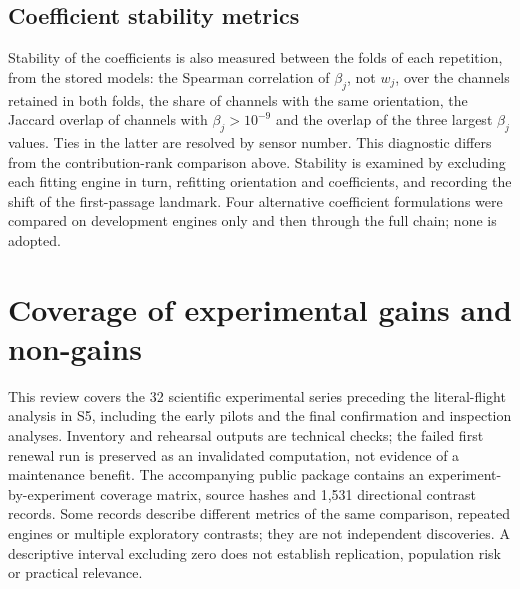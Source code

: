 \documentclass[12pt]{article}
\begin{document}
\subsection*{Coefficient stability metrics}

Stability of the coefficients is also measured between the folds of each repetition, from the stored models: the Spearman correlation of $\beta_j$, not $w_j$, over the channels retained in both folds, the share of channels with the same orientation, the Jaccard overlap of channels with $\beta_j>10^{-9}$ and the overlap of the three largest $\beta_j$ values. Ties in the latter are resolved by sensor number. This diagnostic differs from the contribution-rank comparison above. Stability is examined by excluding each fitting engine in turn, refitting orientation and coefficients, and recording the shift of the first-passage landmark. Four alternative coefficient formulations were compared on development engines only and then through the full chain; none is adopted.

\section{Coverage of experimental gains and non-gains}

This review covers the 32 scientific experimental series preceding the literal-flight analysis in S5, including the early pilots and the final confirmation and inspection analyses. Inventory and rehearsal outputs are technical checks; the failed first renewal run is preserved as an invalidated computation, not evidence of a maintenance benefit. The accompanying public package contains an experiment-by-experiment coverage matrix, source hashes and 1,531 directional contrast records. Some records describe different metrics of the same comparison, repeated engines or multiple exploratory contrasts; they are not independent discoveries. A descriptive interval excluding zero does not establish replication, population risk or practical relevance.
\end{document}
